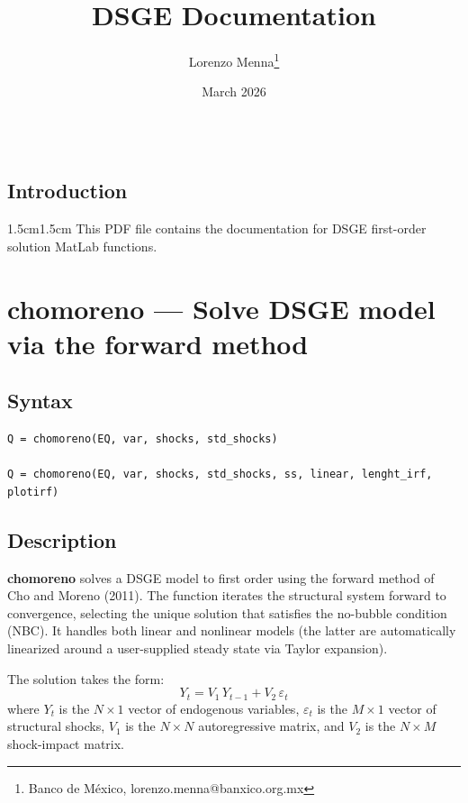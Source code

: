 \documentclass{article}
\title{DSGE Documentation}
\author{Lorenzo Menna\footnote{ Banco de M\'exico, lorenzo.menna@banxico.org.mx}}
\date{March 2026}
\begin{document}
\maketitle
\[\]
\[\]

\begin{center}
    \section*{Introduction}\vspace{2em}
\begin{adjustwidth}{1.5cm}{1.5cm}
This PDF file contains the documentation for DSGE first-order solution MatLab functions. 
\end{adjustwidth}
\end{center}

\break
\tableofcontents

\break

\section{chomoreno --- Solve DSGE model via the forward method}

\subsection{Syntax}

\begin{verbatim}
Q = chomoreno(EQ, var, shocks, std_shocks)

Q = chomoreno(EQ, var, shocks, std_shocks, ss, linear, lenght_irf, plotirf)
\end{verbatim}

\subsection{Description}

\textbf{chomoreno} solves a DSGE model to first order using the forward method of Cho and Moreno (2011). The function iterates the structural system forward to convergence, selecting the unique solution that satisfies the no-bubble condition (NBC). It handles both linear and nonlinear models (the latter are automatically linearized around a user-supplied steady state via Taylor expansion).

The solution takes the form:
\[
Y_t = V_1 \, Y_{t-1} + V_2 \, \varepsilon_t
\]
where $Y_t$ is the $N \times 1$ vector of endogenous variables, $\varepsilon_t$ is the $M \times 1$ vector of structural shocks, $V_1$ is the $N \times N$ autoregressive matrix, and $V_2$ is the $N \times M$ shock-impact matrix.
\end{document}
